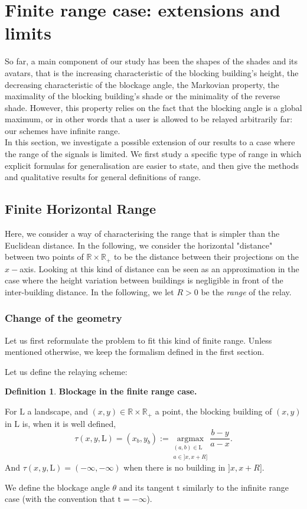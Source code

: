 \documentclass[10pt,english,a4paper]{smfart}
\theoremstyle{definition}
\newtheorem{definition}{Definition}[section]
\theoremstyle{remark}
\newcommand{\R}{\mathbb{R}}
\newcommand{\landsc}{\mathrm{L}}
\newcommand{\Half}{\R \times \R_+}
\begin{document}
\section{Finite range case: extensions and limits}\label{finite_range}


So far, a main component of our study has been the shapes of the shades and its avatars, that is the increasing characteristic of the blocking building's height, the decreasing characteristic of the blockage angle, the Markovian property, the maximality of the blocking building's shade or the minimality of the reverse shade. However, this property relies on the fact that the blocking angle is a global maximum, or in other words that a user is allowed to be relayed arbitrarily far: our schemes have infinite range. \\
In this section, we investigate a possible extension of our results to a case where the range of the signals is limited. We first study a specific type of range in which explicit formulas for generalisation are easier to state, and then give the methods and qualitative results for general definitions of range.

\subsection{Finite Horizontal Range}

Here, we consider a way of characterising the range that is simpler than the Euclidean distance. In the following, we consider the horizontal "distance" between two points of $\Half$ to be the distance between their projections on the $x-$axis. Looking at this kind of distance can be seen as an approximation in the case where the height variation between buildings is negligible in front of the inter-building distance. In the following, we let $R>0$ be the \textit{range} of the relay.

\subsubsection*{Change of the geometry}

Let us first reformulate the problem to fit this kind of finite range. Unless mentioned otherwise, we keep the formalism defined in the first section. 

Let us define the relaying scheme:

\begin{definition}\textbf{Blockage in the finite range case.}

For $\landsc$ a landscape, and $(x, y)\in \Half$ a point, the blocking building of $(x, y)$ in $\landsc$ is, when it is well defined, 
\[\tau (x, y, \landsc) = (x_b, y_b) := \underset{\substack{(a, b) \in \landsc \\a\in ]x, x+R]}}{\text{argmax}} \frac{b-y}{a-x}.\]
And $\tau(x, y, \landsc) = (-\infty, -\infty)$ when there is no building in $]x, x+R]$.

We define the blockage angle $\theta$ and its tangent $\mathrm{t}$ similarly to the infinite range case (with the convention that $\mathrm{t} = -\infty$).
\end{definition}
\end{document}
